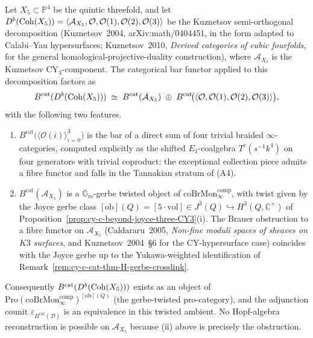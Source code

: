 \begin{proposition}
\label{prop:cy-c-cat-thm-A-quintic-kuznetsov}
Let $X_5 \subset \mathbb P^4$ be the quintic threefold, and let
$D^b(\mathrm{Coh}(X_5)) = \langle \mathcal A_{X_5},
\mathcal O, \mathcal O(1), \mathcal O(2), \mathcal O(3) \rangle$
be the Kuznetsov semi-orthogonal decomposition
(Kuznetsov~2004, arXiv:math/0404451, in the form adapted to Calabi--Yau
hypersurfaces; Kuznetsov~2010, \emph{Derived categories of cubic
fourfolds}, for the general homological-projective-duality construction),
where $\mathcal A_{X_5}$ is the Kuznetsov CY$_3$-component. The
categorical bar functor applied to this decomposition factors as
\[
 B^{\mathrm{cat}}(D^b(\mathrm{Coh}(X_5)))
 \;\simeq\;
 B^{\mathrm{cat}}(\mathcal A_{X_5})
 \;\oplus\;
 B^{\mathrm{cat}}\!\bigl(\langle \mathcal O, \mathcal O(1), \mathcal O(2), \mathcal O(3) \rangle\bigr),
\]
with the following two features.
\begin{enumerate}[label=\textup{(\roman*)}]
 \item $B^{\mathrm{cat}}\bigl(\langle \mathcal O(i) \rangle_{i=0}^{3}\bigr)$
 is the bar of a direct sum of four trivial braided
 $\infty$-categories, computed explicitly as the shifted
 $E_1$-coalgebra $T^c(s^{-1} k^4)$ on four generators with
 trivial coproduct: the exceptional collection piece admits a
 fibre functor and falls in the Tannakian stratum of (A4).
 \item $B^{\mathrm{cat}}(\mathcal A_{X_5})$ is a $\mathbb G_m$-gerbe
 twisted object of $\mathrm{coBrMon}^{\mathrm{comp}}_\infty$,
 with twist given by the Joyce gerbe class
 $[\mathrm{ob}](Q) = [5 \cdot \mathrm{vol}] \in J^3(Q) \hookrightarrow H^3(Q, \mathbb C^\times)$
 of Proposition~\ref{prop:cy-c-beyond-joyce-three-CY3}(i). The
 Brauer obstruction to a fibre functor on $\mathcal A_{X_5}$
 (Caldararu~2005, \emph{Non-fine moduli spaces of sheaves on $K3$ surfaces},
 and Kuznetsov~2004~\S6 for the
 CY-hypersurface case) coincides with the Joyce gerbe up to the
 Yukawa-weighted identification of
 Remark~\ref{rem:cy-c-cat-thm-H-gerbe-crosslink}.
\end{enumerate}
Consequently $B^{\mathrm{cat}}(D^b(\mathrm{Coh}(X_5)))$ exists as an object of
$\mathrm{Pro}(\mathrm{coBrMon}^{\mathrm{comp}}_\infty)^{[\mathrm{ob}](Q)}$
(the gerbe-twisted pro-category), and the adjunction counit
$\varepsilon_{B^{\mathrm{cat}}(\mathcal D)}$ is an equivalence in this
twisted ambient. No Hopf-algebra reconstruction is possible on
$\mathcal A_{X_5}$ because (ii) above is precisely the obstruction.
\end{proposition}

